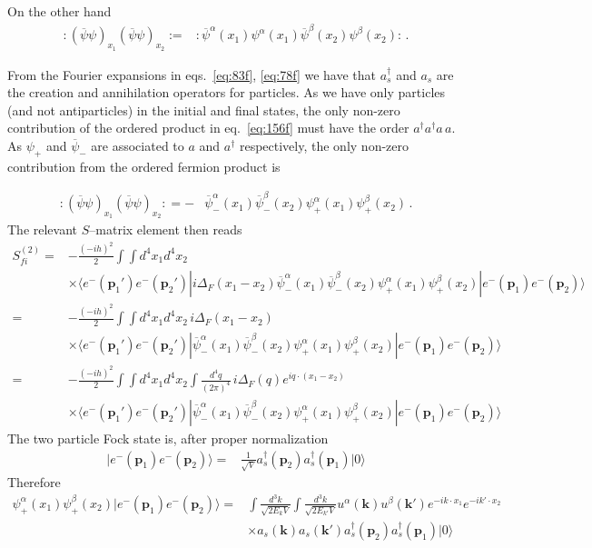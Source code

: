 On the other hand 
\begin{align}
\label{eq:156f}
  :(\overline{\psi}\psi)_{x_1}(\overline{\psi}\psi)_{x_2}:=&
:\overline{\psi}^\alpha(x_1)\psi^\alpha(x_1)\overline{\psi}^\beta(x_2)\psi^\beta(x_2):\,.
\end{align}


From the Fourier expansions in eqs.~\eqref{eq:83f}, \eqref{eq:78f} we have that $a_s^\dagger$ and $a_s$ are the creation and annihilation operators for particles. As we have only particles (and not antiparticles) in the initial and final states, the only non-zero contribution of the ordered product in eq.~\eqref{eq:156f} must have the order $a^\dagger a^\dagger a\, a$. As $\psi_+$ and $\overline{\psi}_-$ are associated to $a$ and $a^\dagger$ respectively, the only non-zero contribution from the ordered fermion product is

\begin{align}
:(\overline{\psi}\psi)_{x_1}(\overline{\psi}\psi)_{x_2}:  
=-&\overline{\psi}^\alpha_-(x_1)\overline{\psi}^\beta_-(x_2)\psi^\alpha_+(x_1)\psi^\beta_+(x_2)\,.
\end{align}
The relevant $S$--matrix element then reads
\begin{align}
  S^{(2)}_{fi}=&-\frac{(-ih)^2}{2}\int\int d^4x_1 d^4x_2\nonumber\\
&\times\langle e^-(\mathbf{p}_1')e^-(\mathbf{p}_2')|
i\Delta_F(x_1-x_2)\overline{\psi}^\alpha_-(x_1)\overline{\psi}^\beta_-(x_2)\psi^\alpha_+(x_1)\psi^\beta_+(x_2)|e^-(\mathbf{p}_1)e^-(\mathbf{p}_2)\rangle\nonumber\\
=&-\frac{(-ih)^2}{2}\int\int d^4x_1 d^4x_2\,i\Delta_F(x_1-x_2)\nonumber\\
&\times\langle e^-(\mathbf{p}_1')e^-(\mathbf{p}_2')|
\overline{\psi}^\alpha_-(x_1)\overline{\psi}^\beta_-(x_2)\psi^\alpha_+(x_1)\psi^\beta_+(x_2)|e^-(\mathbf{p}_1)e^-(\mathbf{p}_2)\rangle\nonumber\\
=&-\frac{(-ih)^2}{2}\int\int d^4x_1 d^4x_2\int\frac{d^4q}{(2\pi)^4}\,i\Delta_F(q)e^{i q\cdot(x_1-x_2)}\nonumber\\
&\times\langle e^-(\mathbf{p}_1')e^-(\mathbf{p}_2')|
\overline{\psi}^\alpha_-(x_1)\overline{\psi}^\beta_-(x_2)\psi^\alpha_+(x_1)\psi^\beta_+(x_2)|e^-(\mathbf{p}_1)e^-(\mathbf{p}_2)\rangle
\end{align}
The two particle Fock state is, after proper normalization
\begin{align}
  |e^-(\mathbf{p}_1)e^-(\mathbf{p}_2)\rangle=&\frac{1}{\sqrt{V}}a_s^\dagger(\mathbf{p}_2)a_s^\dagger(\mathbf{p}_1)|0\rangle
\end{align}
Therefore
\begin{align}
  \psi^\alpha_+(x_1)\psi^\beta_+(x_2)|e^-(\mathbf{p}_1)e^-(\mathbf{p}_2)\rangle=&
\int\frac{d^3k}{\sqrt{2E_k V}}\int\frac{d^3k}{\sqrt{2E_{k'}V}}
u^\alpha(\mathbf{k})u^\beta(\mathbf{k}')e^{-i k\cdot x_1}e^{-i k'\cdot x_2}\nonumber\\
&\times a_s(\mathbf{k})a_s(\mathbf{k}')a_s^\dagger(\mathbf{p}_2)a_s^\dagger(\mathbf{p}_1)|0\rangle
\end{align}

